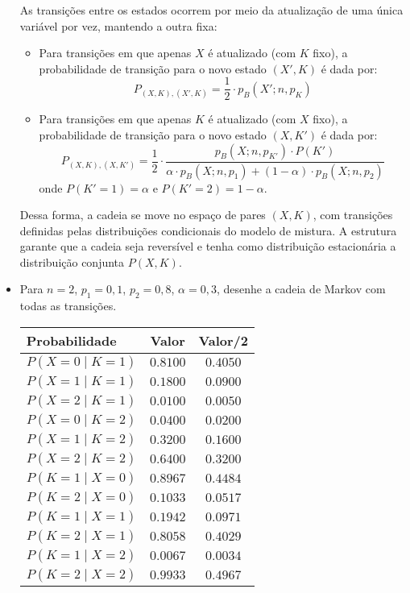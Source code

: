 \begin{itemize}
\begin{resposta}
  As transições entre os estados ocorrem por meio da atualização de uma única variável por vez, mantendo a outra fixa:

  \begin{itemize}
    \item Para transições em que apenas $X$ é atualizado (com $K$ fixo), a probabilidade de transição para o novo estado $(X', K)$ é dada por:
    $$
    P_{(X, K), (X', K)} = \frac{1}{2} \cdot p_B(X'; n, p_K)
    $$

    \item Para transições em que apenas $K$ é atualizado (com $X$ fixo), a probabilidade de transição para o novo estado $(X, K')$ é dada por:
    $$
    P_{(X, K), (X, K')} = \frac{1}{2} \cdot \frac{p_B(X; n, p_{K'}) \cdot P(K')}{\alpha \cdot p_B(X; n, p_1) + (1 - \alpha) \cdot p_B(X; n, p_2)}
    $$
    onde $P(K' = 1) = \alpha$ e $P(K' = 2) = 1 - \alpha$.
  \end{itemize}

  Dessa forma, a cadeia se move no espaço de pares $(X, K)$, com transições definidas pelas distribuições condicionais do modelo de mistura. A estrutura garante que a cadeia seja reversível e tenha como distribuição estacionária a distribuição conjunta $P(X, K)$.
\end{resposta}

  \newpage
  \item Para $n = 2$, $p_1 = 0{,}1$, $p_2 = 0{,}8$, $\alpha = 0{,}3$, desenhe a cadeia de Markov com todas as transições.
  \begin{resposta}

  \begin{center}
\renewcommand{\arraystretch}{1.3}
\begin{tabular}{|l|c|c|}
  \hline
  Probabilidade & Valor & Valor/2 \\
  \hline
  $P(X=0 \mid K=1)$ & $0.8100$ & $0.4050$ \\
  $P(X=1 \mid K=1)$ & $0.1800$ & $0.0900$ \\
  $P(X=2 \mid K=1)$ & $0.0100$ & $0.0050$ \\
  $P(X=0 \mid K=2)$ & $0.0400$ & $0.0200$ \\
  $P(X=1 \mid K=2)$ & $0.3200$ & $0.1600$ \\
  $P(X=2 \mid K=2)$ & $0.6400$ & $0.3200$ \\
  \hline
  $P(K=1 \mid X=0)$ & $0.8967$ & $0.4484$ \\
  $P(K=2 \mid X=0)$ & $0.1033$ & $0.0517$ \\
  $P(K=1 \mid X=1)$ & $0.1942$ & $0.0971$ \\
  $P(K=2 \mid X=1)$ & $0.8058$ & $0.4029$ \\
  $P(K=1 \mid X=2)$ & $0.0067$ & $0.0034$ \\
  $P(K=2 \mid X=2)$ & $0.9933$ & $0.4967$ \\
  \hline
\end{tabular}
\end{center}



\end{resposta}
\end{itemize}
